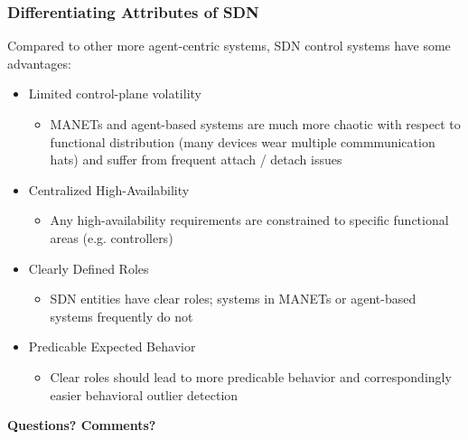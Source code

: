 \documentclass[t,handout]{beamer}
\begin{document}
\begin{frame}
\frametitle{Differentiating Attributes of SDN}
Compared to other more agent-centric systems, SDN control systems have some advantages:
\begin{itemize}
\item Limited control-plane volatility
	\begin{itemize}
	\item MANETs and agent-based systems are much more chaotic with respect to functional distribution (many devices wear multiple commmunication hats) and suffer from frequent attach / detach issues
	\end{itemize}
\item Centralized High-Availability
	\begin{itemize}
	\item Any high-availability requirements are constrained to specific functional areas (e.g. controllers)
	\end{itemize}
\item Clearly Defined Roles
	\begin{itemize}
	\item SDN entities have clear roles; systems in MANETs or agent-based systems frequently do not
	\end{itemize}
\item Predicable Expected Behavior
	\begin{itemize}
	\item Clear roles should lead to more predicable behavior and correspondingly easier behavioral outlier detection
	\end{itemize}
\end{itemize}
\end{frame}

\begin{frame}[c]
\begin{center}
\textbf{Questions? Comments?}
\end{center}
\end{frame}
\end{document}
